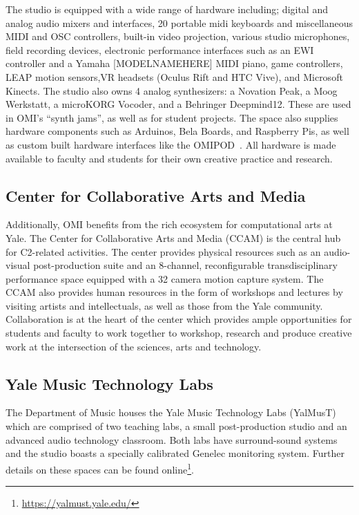 The studio is equipped with a wide range of hardware including; digital and analog audio mixers and interfaces, 20 portable midi keyboards and miscellaneous MIDI and OSC controllers, built-in video projection, various studio microphones, field recording devices, electronic performance interfaces such as an EWI controller and a Yamaha [MODELNAMEHERE] MIDI piano, game controllers, LEAP motion sensors,VR headsets (Oculus Rift and HTC Vive), and Microsoft Kinects. The studio also owns 4 analog synthesizers: a Novation Peak, a Moog Werkstatt, a microKORG Vocoder, and a Behringer Deepmind12. These are used in OMI's ``synth jams'', as well as for student projects. The space also supplies hardware components such as Arduinos, Bela Boards, and Raspberry Pis, as well as custom built hardware interfaces like the OMIPOD~\cite{omipod}. All hardware is made available to faculty and students for their own creative practice and research. 

\subsection{Center for Collaborative Arts and Media}

Additionally, OMI benefits from the rich ecosystem for computational arts at Yale. The Center for Collaborative Arts and Media (CCAM) is the central hub for C2-related activities. The center provides physical resources such as an audio-visual post-production suite and an 8-channel, reconfigurable transdisciplinary performance space equipped with a 32 camera motion capture system. The CCAM also provides human resources in the form of workshops and lectures by visiting artists and intellectuals, as well as those from the Yale community. Collaboration is at the heart of the center which provides ample opportunities for students and faculty to work together to workshop, research and produce creative work at the intersection of the sciences, arts and technology.

\subsection{Yale Music Technology Labs}

The Department of Music houses the Yale Music Technology Labs (YalMusT) which are comprised of two teaching labs, a small post-production studio and an advanced audio technology classroom. Both labs have surround-sound systems and the studio boasts a specially calibrated Genelec monitoring system. Further details on these spaces can be found online\footnote{\url{https://yalmust.yale.edu/}}.

